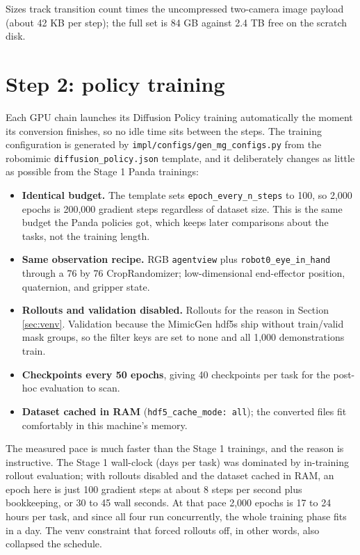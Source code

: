 \documentclass[11pt]{article}
\begin{document}
Sizes track transition count times the uncompressed two-camera image payload
(about 42 KB per step); the full set is 84 GB against 2.4 TB free on the
scratch disk.

\section{Step 2: policy training}
\label{sec:train}

Each GPU chain launches its Diffusion Policy training automatically the moment
its conversion finishes, so no idle time sits between the steps. The training
configuration is generated by \texttt{impl/configs/gen\_mg\_configs.py} from
the robomimic \texttt{diffusion\_policy.json} template, and it deliberately
changes as little as possible from the Stage 1 Panda trainings:

\begin{itemize}[leftmargin=2em]
  \item \textbf{Identical budget.} The template sets
        \texttt{epoch\_every\_n\_steps} to 100, so 2{,}000 epochs is 200{,}000
        gradient steps regardless of dataset size. This is the same budget the
        Panda policies got, which keeps later comparisons about the tasks, not
        the training length.
  \item \textbf{Same observation recipe.} RGB \texttt{agentview} plus
        \texttt{robot0\_eye\_in\_hand} through a 76 by 76 CropRandomizer;
        low-dimensional end-effector position, quaternion, and gripper state.
  \item \textbf{Rollouts and validation disabled.} Rollouts for the reason in
        Section \ref{sec:venv}. Validation because the MimicGen hdf5s ship
        without train/valid mask groups, so the filter keys are set to none and
        all 1{,}000 demonstrations train.
  \item \textbf{Checkpoints every 50 epochs}, giving 40 checkpoints per task
        for the post-hoc evaluation to scan.
  \item \textbf{Dataset cached in RAM} (\texttt{hdf5\_cache\_mode: all}); the
        converted files fit comfortably in this machine's memory.
\end{itemize}

The measured pace is much faster than the Stage 1 trainings, and the reason is
instructive. The Stage 1 wall-clock (days per task) was dominated by
in-training rollout evaluation; with rollouts disabled and the dataset cached
in RAM, an epoch here is just 100 gradient steps at about 8 steps per second
plus bookkeeping, or 30 to 45 wall seconds. At that pace 2{,}000 epochs is 17
to 24 hours per task, and since all four run concurrently, the whole training
phase fits in a day. The venv constraint that forced rollouts off, in other
words, also collapsed the schedule.
\end{document}
